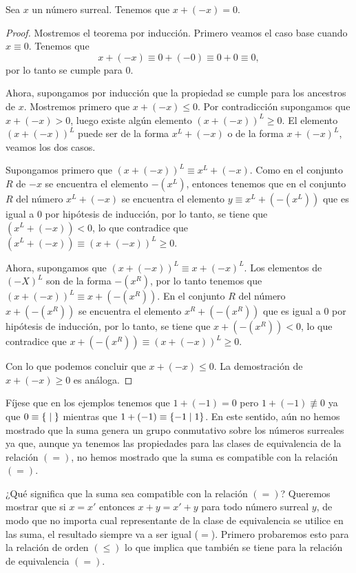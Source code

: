    \begin{theorem}
        Sea $x$ un n\'umero surreal. Tenemos que $x+(-x)=0$.
    \end{theorem}

    \begin{proof}
        Mostremos el teorema por inducci\'on. Primero veamos el caso base cuando $x\equiv 0$. Tenemos que
        \[
            x + (-x) \equiv 0 + (-0) \equiv 0+0 \equiv 0,
        \]
        por lo tanto se cumple para $0$.

        Ahora, supongamos por inducci\'on que la propiedad se cumple para los ancestros de $x$. Mostremos primero que $x + (-x) \le 0$. Por contradicci\'on supongamos que $x + (-x) > 0$, luego existe alg\'un elemento $(x + (-x))^L \ge 0$. El elemento $(x + (-x))^L$ puede ser de la forma $x^L + (-x)$ o de la forma $x + (-x)^L$, veamos los dos casos.

        Supongamos primero que $(x + (-x))^L \equiv x^L + (-x)$. Como en el conjunto $R$ de $-x$ se encuentra el elemento $-(x^L)$, entonces tenemos que en el conjunto $R$ del n\'umero $x^L + (-x)$ se encuentra el elemento $y \equiv x^L + (-(x^L))$ que es igual a $0$ por hip\'otesis de inducci\'on, por lo tanto, se tiene que $(x^L + (-x)) < 0$, lo que contradice que $(x^L + (-x))\equiv (x + (-x))^L \ge 0$.

        Ahora, supongamos que $(x + (-x))^L \equiv x + (-x)^L$. Los elementos de $(-X)^L$ son de la forma $-(x^R)$, por lo tanto tenemos que $(x + (-x))^L\equiv x + (-(x^R))$. En el conjunto $R$ del n\'umero $x + (-(x^R))$ se encuentra el elemento $x^R + (-(x^R))$ que es igual a $0$ por hip\'otesis de inducci\'on, por lo tanto, se tiene que $x + (-(x^R)) < 0$, lo que contradice que $x + (-(x^R))\equiv (x + (-x))^L \ge 0$.

        Con lo que podemos concluir que $x + (-x) \le 0$. La demostraci\'on de $x+(-x) \ge 0$ es an\'aloga.
    \end{proof}


    F\'ijese que en los ejemplos tenemos que $1+(-1) = 0$ pero $1+(-1)\not\equiv 0$ ya que $0\equiv \left\{\;\middle|\; \right\}$ mientras que $1+(-1)\equiv \left\{-1\;\middle|\; 1\right\}$. En este sentido, a\'un no hemos mostrado que la suma genera un grupo conmutativo sobre los n\'umeros surreales ya que, aunque ya tenemos las propiedades para las clases de equivalencia de la relaci\'on $(=)$, no hemos mostrado que la suma es compatible con la relaci\'on $(=)$.
    
    ¿Qué significa que la suma sea compatible con la relaci\'on $(=)$? Queremos mostrar que si $x = x'$ entonces $x+y = x'+y$ para todo n\'umero surreal $y$, de modo que no importa cual representante de la clase de equivalencia se utilice en las suma, el resultado siempre va a ser igual ($=$). Primero probaremos esto para la relaci\'on de orden $(\le)$ lo que implica que tambi\'en se tiene para la relaci\'on de equivalencia $(=)$.

